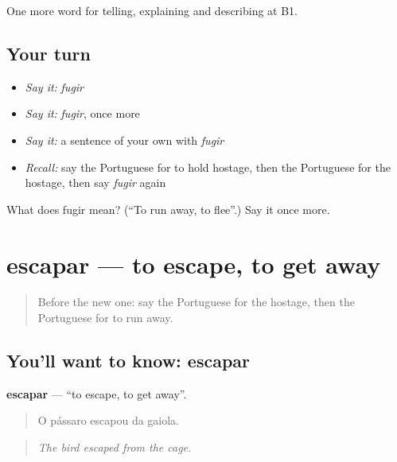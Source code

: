 \begin{grammarlens}[title={What you've built}]
One more word for telling, explaining and describing at B1.
\end{grammarlens}

\subsection*{Your turn}
\begin{itemize}
\raggedright
  \item \emph{Say it:} \emph{fugir}
  \item \emph{Say it:} \emph{fugir}, once more
  \item \emph{Say it:} a sentence of your own with \emph{fugir}
  \item \emph{Recall:} say the Portuguese for to hold hostage, then the Portuguese for the hostage, then say \emph{fugir} again
\end{itemize}

\begin{tcolorbox}[breakable,colback=teal!4,colframe=teal!35!black,title={Before you move on}]
What does fugir mean? (\textquotedblleft{}To run away, to flee\textquotedblright{}.) Say it once more.
\end{tcolorbox}
\section[escapar]{escapar — to escape, to get away}

\label{lesson:PT-C292-escapar}



\begin{quote}
Before the new one: say the Portuguese for the hostage, then the Portuguese for to run away.
\end{quote}

\subsection*{You'll want to know: escapar}
\textbf{escapar} — \textquotedblleft{}to escape, to get away\textquotedblright{}.

\begin{quote}
O pássaro escapou da gaiola.
\end{quote}

\begin{quote}
\emph{The bird escaped from the cage.}
\end{quote}

